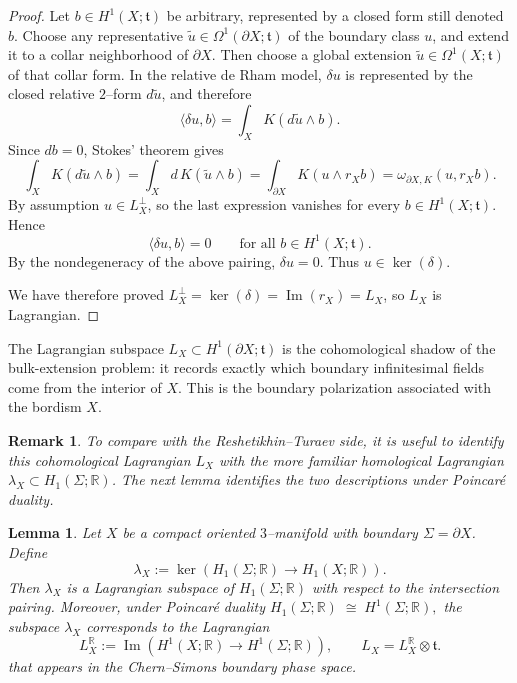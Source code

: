 \documentclass[12pt]{amsart}
\numberwithin{equation}{section}
\newtheorem{lemma}[theorem]{Lemma}
\newtheorem*{remark}{Remark}
\begin{document}
\begin{proof}
Let $b\in H^1(X;\mathfrak t)$ be arbitrary, represented by a closed form still denoted $b$.
Choose any representative $\tilde u\in \Omega^1(\partial X;\mathfrak t)$ of the boundary class $u$,
and extend it to a collar neighborhood of $\partial X$. Then choose a global extension
$\widetilde u\in \Omega^1(X;\mathfrak t)$ of that collar form. In the relative de Rham model,
$\delta u$ is represented by the closed relative $2$--form $d\widetilde u$, and therefore
\[
\langle \delta u,b\rangle
=
\int_X K(d\widetilde u\wedge b).
\]
Since $db=0$, Stokes' theorem gives
\[
\int_X K(d\widetilde u\wedge b)
=
\int_X d\,K(\widetilde u\wedge b)
=
\int_{\partial X} K(u\wedge r_X b)
=
\omega_{\partial X,K}(u,r_X b).
\]
By assumption $u\in L_X^\perp$, so the last expression vanishes for every
$b\in H^1(X;\mathfrak t)$. Hence
\[
\langle \delta u,b\rangle =0
\qquad\text{for all } b\in H^1(X;\mathfrak t).
\]
By the nondegeneracy of the above pairing, $\delta u=0$. Thus $u\in \ker(\delta)$.

We have therefore proved $L_X^\perp=\ker(\delta)=\operatorname{Im}(r_X)=L_X$, so $L_X$ is Lagrangian.
\end{proof}

The Lagrangian subspace \(L_X\subset H^1(\partial X;\mathfrak t)\) is the
cohomological shadow of the bulk-extension problem: it records exactly which
boundary infinitesimal fields come from the interior of \(X\). This is the
boundary polarization associated with the bordism \(X\).

\begin{remark}
To compare with the Reshetikhin--Turaev side, it is useful to identify this cohomological Lagrangian \(L_X\) with the more familiar homological Lagrangian
\(\lambda_X\subset H_1(\Sigma;\mathbb R)\). The next lemma identifies the two
descriptions under Poincar\'e duality.
\end{remark}


\begin{lemma}\label{RT/CS boundary Lagrangian correspondence}
Let $X$ be a compact oriented $3$–manifold with boundary $\Sigma = \partial X$. Define
\[
\lambda_X := \ker\!\left(H_1(\Sigma;\mathbb{R}) \longrightarrow H_1(X;\mathbb{R})\right).
\]
Then $\lambda_X$ is a Lagrangian subspace of $H_1(\Sigma;\mathbb{R})$ with respect to the intersection pairing. Moreover, under Poincaré duality $H_1(\Sigma;\mathbb{R}) \;\cong\; H^1(\Sigma;\mathbb{R}),$ the subspace $\lambda_X$ corresponds to the Lagrangian
\[
L_X^{\mathbb R} := \operatorname{Im}\!\left(H^1(X;\mathbb R) \longrightarrow H^1(\Sigma;\mathbb R)\right), \qquad L_X=L_X^{\mathbb R}\otimes\mathfrak t.
\]
that appears in the Chern–Simons boundary phase space.
\end{lemma}
\end{document}
